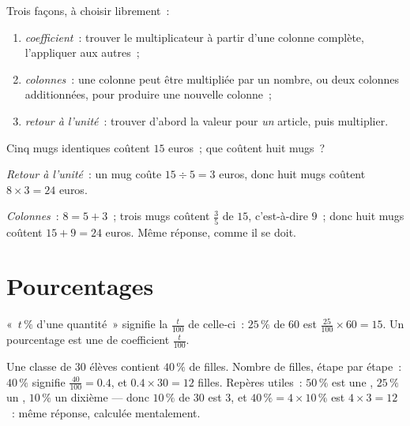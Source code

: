 \begin{method}\label{met:g6:propdata:complete}
Trois façons, à choisir librement~:
\begin{enumerate}
  \item \emph{coefficient}~: trouver le multiplicateur à partir d'une
        colonne complète, l'appliquer aux autres~;
  \item \emph{colonnes}~: une colonne peut être multipliée par un
        nombre, ou deux colonnes additionnées, pour produire une
        nouvelle colonne~;
  \item \emph{retour à l'unité}~: trouver d'abord la valeur pour
        \emph{un} article, puis multiplier.
\end{enumerate}
\end{method}

\begin{example}\label{ex:g6:propdata:methods}
Cinq mugs identiques coûtent $15$ euros~; que coûtent huit mugs~?

\emph{Retour à l'unité}~: un mug coûte $15 \div 5 = 3$ euros, donc
huit mugs coûtent $8 \times 3 = 24$ euros.

\emph{Colonnes}~: $8 = 5 + 3$~; trois mugs coûtent $\frac{3}{5}$ de
$15$, c'est-à-dire $9$~; donc huit mugs coûtent $15 + 9 = 24$ euros.
Même réponse, comme il se doit.
\end{example}

\section{Pourcentages}

\begin{definition}[Pourcentage]\label{def:g6:propdata:percent}
«~$t\,\%$ d'une quantité~» signifie la  $\frac{t}{100}$ de
celle-ci~: $25\,\%$ de $60$ est $\frac{25}{100} \times 60 = 15$. Un
pourcentage est une  de coefficient $\frac{t}{100}$.
\end{definition}

\begin{example}\label{ex:g6:propdata:percent}
Une classe de $30$ élèves contient $40\,\%$ de filles. Nombre de
filles, étape par étape~: $40\,\%$ signifie $\frac{40}{100} = 0.4$, et
$0.4 \times 30 = 12$ filles. Repères utiles~:
$50\,\%$ est une , $25\,\%$ un , $10\,\%$ un dixième ---
donc $10\,\%$ de $30$ est $3$, et $40\,\% = 4 \times 10\,\%$ est
$4 \times 3 = 12$~: même réponse, calculée mentalement.
\end{example}

